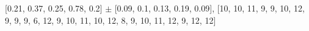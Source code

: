 
[0.21, 0.37, 0.25, 0.78, 0.2] $\pm$ [0.09, 0.1, 0.13, 0.19, 0.09], [10, 10, 11, 9, 9, 10, 12, 9, 9, 9, 6, 12, 9, 10, 11, 10, 12, 8, 9, 10, 11, 12, 9, 12, 12]\\
